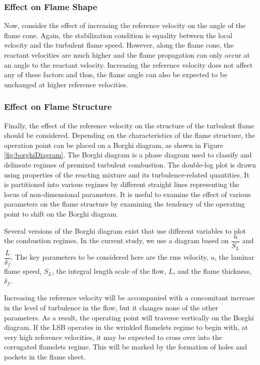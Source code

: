 \subsubsection{Effect on Flame Shape}

Now, consider the effect of increasing the reference velocity on the angle of the flame cone.
Again, the stabilization condition is equality between the local velocity and the turbulent flame speed.
However, along the flame cone, the reactant velocities are much higher and the flame propagation can only occur at an angle to the reactant velocity.
Increasing the reference velocity does not affect any of these factors and thus, the flame angle can also be expected to be unchanged at higher reference velocities.

\subsubsection{Effect on Flame Structure}

Finally, the effect of the reference velocity on the structure of the turbulent flame should be considered.
Depending on the characteristics of the flame structure, the operation point can be placed on a Borghi diagram, as shown in Figure \ref{fig:borghiDiagram}.
The Borghi diagram\cite{1985-borghi} is a phase diagram used to classify and delineate regimes of premixed turbulent combustion.
The double-log plot is drawn using properties of the reacting mixture and its turbulence-related quantities.
It is partitioned into various regimes by different straight lines representing the locus of non-dimensional parameters.
It is useful to examine the effect of various parameters on the flame structure by examining the tendency of the operating point to shift on the Borghi diagram.



Several versions of the Borghi diagram exist that use different variables to plot the combustion regimes.
In the current study, we use a diagram based on \(\dfrac{ u }{ S_L }\) and \(\dfrac{ L }{ \delta_f }\).
The key parameters to be considered here are the rms velocity, \(u\), the laminar flame speed, \(S_L\), the integral length scale of the flow, \(L\), and the flame thickness, \(\delta_f\).


Increasing the reference velocity will be accompanied with a concomitant increase in the level of turbulence in the flow, but it changes none of the other parameters.
As a result, the operating point will traverse vertically on the Borghi diagram.
If the LSB operates in the wrinkled flamelets regime to begin with, at very high reference velocities, it may be expected to cross over into the corrugated flamelets regime.
This will be marked by the formation of holes and pockets in the flame sheet.

